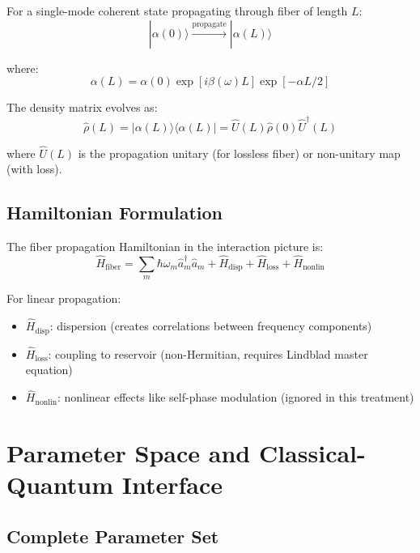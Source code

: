 \documentclass[12pt,a4paper]{article}
\begin{document}
For a single-mode coherent state propagating through fiber of length $L$:
\begin{equation}
|\alpha(0)\rangle \xrightarrow{\text{propagate}} |\alpha(L)\rangle
\end{equation}

where:
\begin{equation}
\alpha(L) = \alpha(0) \exp[i\beta(\omega)L] \exp[-\alpha L/2] \label{eq:coherent_propagation}
\end{equation}

The density matrix evolves as:
\begin{equation}
\hat{\rho}(L) = |\alpha(L)\rangle\langle\alpha(L)| = \hat{U}(L) \hat{\rho}(0) \hat{U}^\dagger(L)
\end{equation}

where $\hat{U}(L)$ is the propagation unitary (for lossless fiber) or non-unitary map (with loss).

\subsection{Hamiltonian Formulation}

The fiber propagation Hamiltonian in the interaction picture is:
\begin{equation}
\hat{H}_{\text{fiber}} = \sum_m \hbar \omega_m \hat{a}_m^\dagger \hat{a}_m + \hat{H}_{\text{disp}} + \hat{H}_{\text{loss}} + \hat{H}_{\text{nonlin}}
\end{equation}

For linear propagation:
\begin{itemize}[leftmargin=*]
\item $\hat{H}_{\text{disp}}$: dispersion (creates correlations between frequency components)
\item $\hat{H}_{\text{loss}}$: coupling to reservoir (non-Hermitian, requires Lindblad master equation)
\item $\hat{H}_{\text{nonlin}}$: nonlinear effects like self-phase modulation (ignored in this treatment)
\end{itemize}

\section{Parameter Space and Classical-Quantum Interface}

\subsection{Complete Parameter Set}
\end{document}
